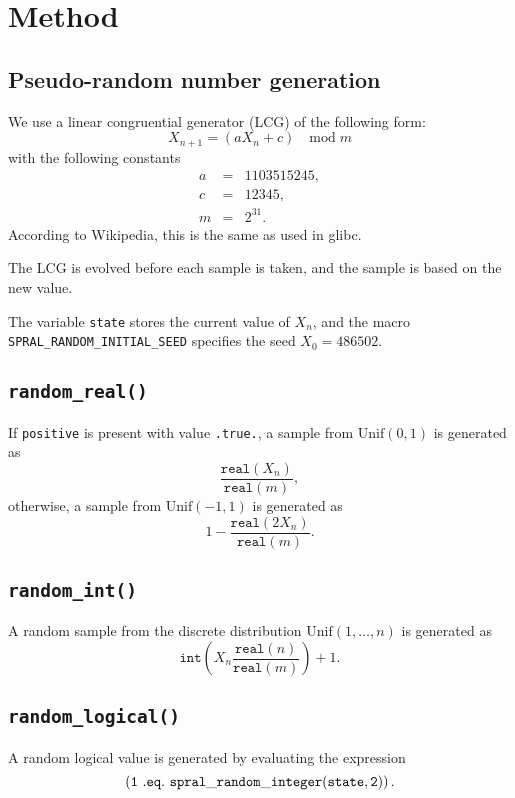\section{Method}

\subsection{Pseudo-random number generation}
We use a linear congruential generator (LCG) of the following form:
$$
   X_{n+1} = (aX_n + c)\quad \mathrm{mod}\; m
$$
with the following constants
\begin{eqnarray*}
   a &=& 1103515245, \\
   c &=& 12345, \\
   m &=& 2^{31}.
\end{eqnarray*}
According to Wikipedia, this is the same as used in glibc.

The LCG is evolved before each sample is taken, and the sample is based on the
new value.

The variable \texttt{state} stores the current value of $X_n$, and the macro
\texttt{SPRAL\_RANDOM\_INITIAL\_SEED} specifies the seed $X_0 = 486502$.

\subsection{\tt random\_real()}
If {\tt positive} is present with value {\tt .true.}, a sample from $\mathrm{Unif}(0,1)$ is generated as
$$
   \frac{\texttt{real}(X_n)}{\texttt{real}(m)},
$$
otherwise, a sample from $\mathrm{Unif}(-1,1)$ is generated as
$$
   1 - \frac{\texttt{real}(2X_n)}{\texttt{real}(m)}.
$$

\subsection{\tt random\_int()}
A random sample from the discrete distribution $\mathrm{Unif}(1, \ldots, n)$ is
generated as
$$
   \texttt{int}\left( X_n \frac{\texttt{real}(n)}{\texttt{real}(m)} \right) + 1.
$$

\subsection{\tt random\_logical()}
A random logical value is generated by evaluating the expression
$$
\tt \left(1\ .eq.\ spral\_random\_integer(state, 2)\right).
$$



